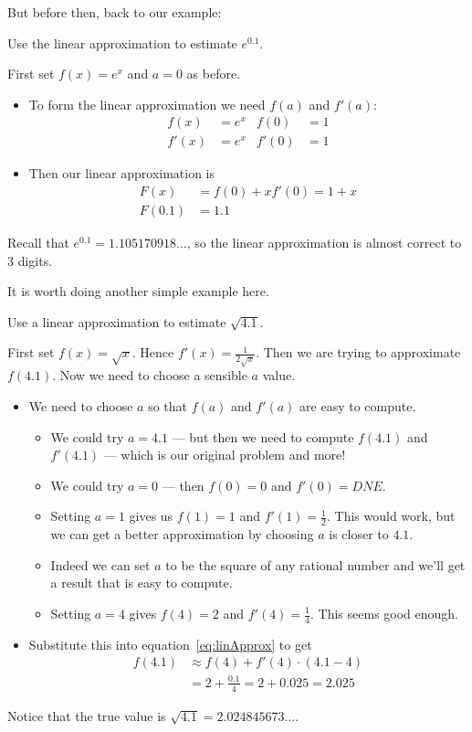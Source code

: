 But before then, back to our example:
\begin{eg}\label{eg_3_4_1}
 Use the linear approximation to estimate $e^{0.1}$.

\soln First set $f(x) = e^x$ and $a=0$ as before.
\begin{itemize}
 \item To form the linear approximation we need $f(a)$ and $f'(a)$:
\begin{align*}
  f(x) &= e^x & f(0) & = 1 \\
  f'(x) &= e^x & f'(0) & = 1
\end{align*}
\item Then our linear approximation is
\begin{align*}
  F(x) &= f(0) + x f'(0) = 1 + x \\
  F(0.1) &= 1.1
\end{align*}
\end{itemize}
Recall that $e^{0.1} = 1.105170918\dots$, so the linear approximation is
almost correct to 3 digits.
\end{eg}

It is worth doing another simple example here.
\begin{eg}\label{eg_3_4_2}
 Use a linear approximation to estimate $\sqrt{4.1}$.

\soln First set $f(x)=\sqrt{x}$. Hence $f'(x) = \frac{1}{2\sqrt{x}}$. Then we are trying
to approximate $f(4.1)$. Now we need to choose a sensible $a$ value.
\begin{itemize}
 \item We need to choose $a$ so that $f(a)$ and $f'(a)$ are easy to compute.
\begin{itemize}
 \item We could try $a=4.1$ --- but then we need to compute $f(4.1)$ and $f'(4.1)$ ---
which is our original problem and more!
\item We could try $a=0$ --- then $f(0)=0$ and $f'(0) = DNE$.
\item Setting $a=1$ gives us $f(1)=1$ and $f'(1)=\frac{1}{2}$. This would work, but we
can get a better approximation by choosing $a$ is closer to $4.1$.
\item Indeed we can set $a$ to be the square of any rational number and we'll get a
result that is easy to compute.
\item Setting $a=4$ gives $f(4)=2$ and $f'(4) = \frac{1}{4}$. This seems good enough.
\end{itemize}
\item Substitute this into equation~\eqref{eq:linApprox} to get
\begin{align*}
  f(4.1) &\approx f(4) + f'(4) \cdot(4.1-4) \\
  &= 2 + \frac{0.1}{4} = 2 + 0.025 = 2.025
\end{align*}
\end{itemize}
Notice that the true value is $\sqrt{4.1} = 2.024845673\dots$.
\end{eg}



